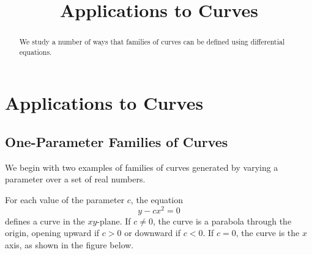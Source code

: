 \documentclass{ximera}
\title{Applications to Curves}
\begin{document}
 
\begin{abstract}
 We study a number of ways that families of curves can be defined using differential equations.
\end{abstract}
 
\maketitle
 
 
 
\section*{Applications to Curves}
 
\subsection*{One-Parameter Families of Curves}
 
We begin with two examples of families of curves generated by varying a parameter over a set of real numbers.
 
\begin{example}\label{example:4.5.1}
For each value of the parameter $c$, the equation
\begin{equation} \label{eq:4.5.1}
y-cx^2=0
\end{equation}
defines a curve in the $xy$-plane. If $c \neq 0$, the curve is a
parabola through the origin, opening upward if $c>0$ or downward if
$c<0$.   If $c=0$, the curve is the $x$ axis, as shown in the figure below.

 \begin{center}
\end{center}

 
\end{example}
 
\end{document}
